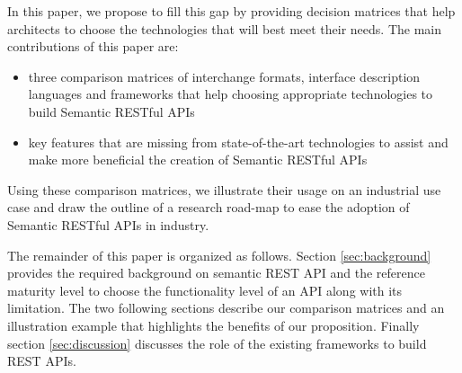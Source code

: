  
 
In this paper, we propose to fill this gap by providing decision matrices that help architects to choose the technologies that will best meet their needs. The main contributions of this paper are:

\begin{itemize}
    \item three comparison matrices of interchange formats, interface description languages and frameworks that help choosing appropriate technologies to build Semantic RESTful APIs
    \item key features that are missing from state-of-the-art technologies to assist and make more beneficial the creation of Semantic RESTful APIs
\end{itemize}

Using these comparison matrices, we illustrate their usage on an industrial use case and draw the outline of a research road-map to ease the adoption of Semantic RESTful APIs in industry.

The remainder of this paper is organized as follows. Section \ref{sec:background} provides the required background on semantic REST API and the reference maturity level to choose the functionality level of an API along with its limitation. The two following sections describe our comparison matrices and an illustration example that highlights the benefits of our proposition. Finally section \ref{sec:discussion} discusses the role of the existing frameworks to build REST APIs. 
